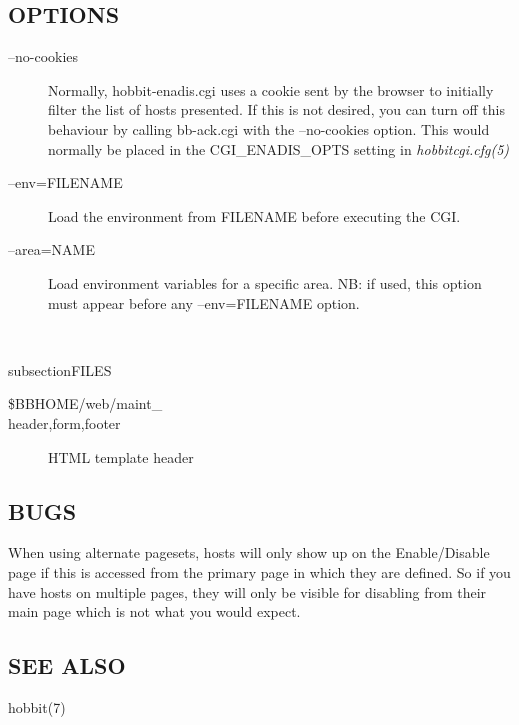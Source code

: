 \subsection{OPTIONS}
\begin{description}
\item[--no-cookies] Normally, hobbit-enadis.cgi uses a cookie sent by
  the browser to initially filter the list of hosts presented. If this
  is not desired, you can turn off this behaviour by calling
  bb-ack.cgi with the --no-cookies option. This would normally be
  placed in the CGI\_ENADIS\_OPTS setting in \emph{hobbitcgi.cfg(5)}



 

\item[--env=FILENAME] Load the environment from FILENAME before
  executing the CGI. 


 

\item[--area=NAME] Load environment variables for a specific area. NB:
  if used, this option must appear before any --env=FILENAME option. 

\end{description}
\

subsection{FILES}
\begin{description}
\item [\$BBHOME/web/maint\_\\{header,form,footer\\}] HTML template header 

 


\end{description}
\subsection{BUGS}
 When using alternate pagesets, hosts will only show up on the
 Enable/Disable page if this is accessed from the primary page in
 which they are defined. So if you have hosts on multiple pages, they
 will only be visible for disabling from their main page which is not
 what you would expect. 


 
\subsection{SEE ALSO}
hobbit(7) 

 
%
\newpage
